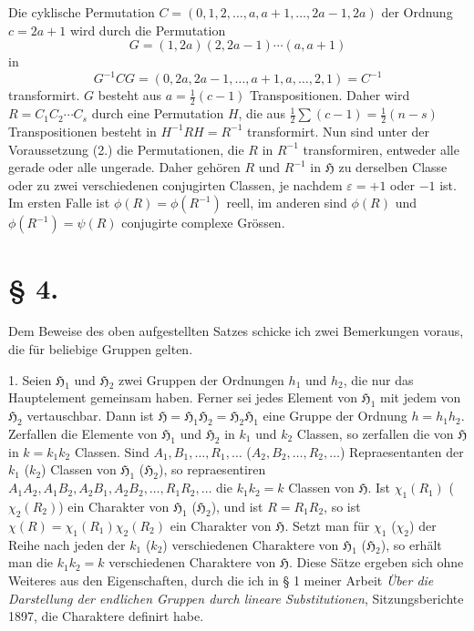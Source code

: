 \documentclass[11pt]{article}
\newcommand{\Hgr}{\mathfrak{H}}
\newcommand{\eps}{\varepsilon}
\begin{document}
Die cyklische Permutation $C=(0,1,2,\ldots,a,a+1,\ldots,2a-1,2a)$ der Ordnung $c=2a+1$ wird durch die Permutation
\[
 G=(1,2a)(2,2a-1)\cdots(a,a+1)
\]
in
\[
 G^{-1}CG=(0,2a,2a-1,\ldots,a+1,a,\ldots,2,1)=C^{-1}
\]
transformirt. $G$ besteht aus $a=\frac12(c-1)$ Transpositionen. Daher wird $R=C_1C_2\cdots C_s$ durch eine Permutation $H$, die aus $\frac12\sum(c-1)=\frac12(n-s)$ Transpositionen besteht in $H^{-1}RH=R^{-1}$ transformirt. Nun sind unter der Voraussetzung (2.) die Permutationen, die $R$ in $R^{-1}$ transformiren, entweder alle gerade oder alle ungerade. Daher gehören $R$ und $R^{-1}$ in $\Hgr$ zu derselben Classe oder zu zwei verschiedenen conjugirten Classen, je nachdem $\eps=+1$ oder $-1$ ist. Im ersten Falle ist $\phi(R)=\phi(R^{-1})$ reell, im anderen sind $\phi(R)$ und $\phi(R^{-1})=\psi(R)$ conjugirte complexe Grössen.

\section*{§ 4.}

Dem Beweise des oben aufgestellten Satzes schicke ich zwei Bemerkungen voraus, die für beliebige Gruppen gelten.

1. Seien $\Hgr_1$ und $\Hgr_2$ zwei Gruppen der Ordnungen $h_1$ und $h_2$, die nur das Hauptelement gemeinsam haben. Ferner sei jedes Element von $\Hgr_1$ mit jedem von $\Hgr_2$ vertauschbar. Dann ist $\Hgr=\Hgr_1\Hgr_2=\Hgr_2\Hgr_1$ eine Gruppe der Ordnung $h=h_1h_2$. Zerfallen die Elemente von $\Hgr_1$ und $\Hgr_2$ in $k_1$ und $k_2$ Classen, so zerfallen die von $\Hgr$ in $k=k_1k_2$ Classen. Sind $A_1,B_1,\ldots,R_1,\ldots$ ($A_2,B_2,\ldots,R_2,\ldots$) Repraesentanten der $k_1$ ($k_2$) Classen von $\Hgr_1$ ($\Hgr_2$), so repraesentiren $A_1A_2,A_1B_2,A_2B_1,A_2B_2,\ldots,R_1R_2,\ldots$ die $k_1k_2=k$ Classen von $\Hgr$. Ist $\chi_1(R_1)$ ($\chi_2(R_2)$) ein Charakter von $\Hgr_1$ ($\Hgr_2$), und ist $R=R_1R_2$, so ist $\chi(R)=\chi_1(R_1)\chi_2(R_2)$ ein Charakter von $\Hgr$. Setzt man für $\chi_1$ ($\chi_2$) der Reihe nach jeden der $k_1$ ($k_2$) verschiedenen Charaktere von $\Hgr_1$ ($\Hgr_2$), so erhält man die $k_1k_2=k$ verschiedenen Charaktere von $\Hgr$. Diese Sätze ergeben sich ohne Weiteres aus den Eigenschaften, durch die ich in § 1 meiner Arbeit \emph{Über die Darstellung der endlichen Gruppen durch lineare Substitutionen}, Sitzungsberichte 1897, die Charaktere definirt habe.
\end{document}
